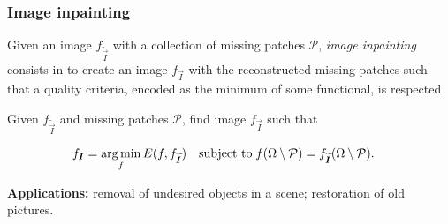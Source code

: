 \subsubsection{Image inpainting}
Given an image $f_{\widetilde{\vec{I}}}$ with a collection of missing patches $\mathcal{P}$, \emph{image inpainting} consists in to create an image $f_{\vec{I}}$ with the reconstructed missing patches such that a quality criteria, encoded as the minimum of some functional, is respected

Given $f_{\widetilde{\vec{I}}}$ and missing patches $\mathcal{P}$, find image $f_{\vec{I}}$ such that

\begin{align*}
	f_{\bm{I}} &= \operatorname*{arg\,min}_f E(f,f_{\widetilde{\bm{I}}}) \quad \text{subject to}\; f(\Omega \setminus \mathcal{P}) = f_{\widetilde{\bm{I}}}(\Omega \setminus \mathcal{P}).
\end{align*}

\textbf{Applications:} removal of undesired objects in a scene; restoration of old pictures. 

